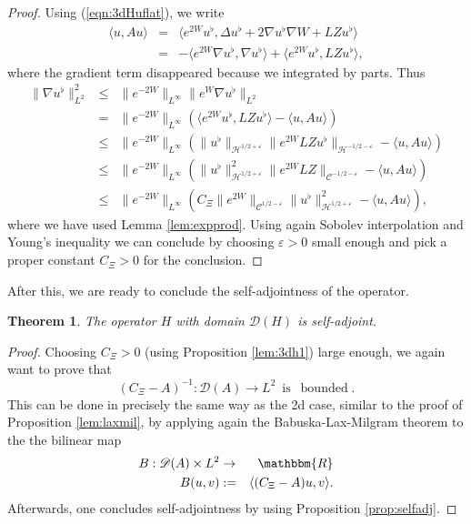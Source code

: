 \documentclass[11pt, oneside]{article}   	%
\newcommand{\tmop}[1]{\ensuremath{\operatorname{#1}}}
\newtheorem{theorem}{Theorem}[section]
\newcommand{\CC}{\mathscr{C}}
\newcommand{\ssp}{\mathscr{H}}
\begin{document}
\begin{proof}
	Using (\ref{eqn:3dHuflat}), we write
	\begin{eqnarray*}
		\langle u, A u \rangle & = & \langle e^{2 W} u^{\flat}, \Delta u^{\flat} +
		2 \nabla u^{\flat} \nabla W + L Z u^{\flat} \rangle\\
		& = & - \langle e^{2 W} \nabla u^{\flat}, \nabla u^{\flat} \rangle +
		\langle e^{2 W} u^{\flat}, L Z u^{\flat} \rangle,
	\end{eqnarray*}
	where the gradient term disappeared because we integrated by parts. Thus
	\begin{eqnarray*}
		\| \nabla u^{\flat} \|^2_{L^2} & \le & \| e^{- 2 W} \|_{L^{\infty}}
		\| e^W \nabla u^{\flat} \|_{L^2}\\
		& = & \| e^{- 2 W} \|_{L^{\infty}} (\langle e^{2 W} u^{\flat}, L Z u^{\flat} \rangle - \langle u, A u \rangle)\\
		& \le & \| e^{- 2 W} \|_{L^{\infty}} (\| u^{\flat} \|_{\ssp^{1 / 2 +
				\varepsilon}} \| e^{2 W} L Z u^{\flat} \|_{\ssp^{- 1 / 2 -
				\varepsilon}} - \langle u, A u \rangle)\\
		& \le & \| e^{- 2 W} \|_{L^{\infty}} (\| u^{\flat} \|^2_{\ssp^{1 / 2 +
				\varepsilon}} \| e^{2 W} L Z \|_{\CC^{- 1 / 2 -
				\varepsilon}} - \langle u, A u \rangle)\\
		& \le & \| e^{- 2 W} \|_{L^{\infty}} (C_{\Xi} \| e^{2 W}
		\|_{\CC^{1 / 2 - \varepsilon}} \| u^{\flat} \|^2_{\ssp^{1 / 2 +
				\varepsilon}} - \langle u, A u \rangle),
	\end{eqnarray*}
	where we have used Lemma \ref{lem:expprod}. Using again Sobolev
	interpolation and Young's inequality we can conclude by choosing
	$\varepsilon > 0$ small enough and pick a proper constant $C_\Xi >0$ for the conclusion.
\end{proof}

After this, we are ready to conclude the self-adjointness of the operator.
\begin{theorem} \label{thm:3dselfadj}
	The operator $H$ with domain $\mathscr{D}
	(H)$ is self-adjoint.
\end{theorem}
\begin{proof}
	Choosing $C_{\Xi} > 0$ (using Proposition \ref{lem:3dh1})
	large enough, we again want to prove that
	\[ (C_{\Xi} - A)^{- 1} : \mathscr{D} (A) \rightarrow L^2 \ \tmop{is} \
	\tmop{bounded} . \]
	This can be done in precisely the same way as the 2d case, similar to the proof of Proposition \ref{lem:laxmil},  by applying again the Babuska-Lax-Milgram theorem to the the bilinear map
	\begin{eqnarray*}
		B : \mathscr{D} (A) \times L^2 & \rightarrow & \mathbbm{R}\\
		B (u, v) & : = & \langle (C_{\Xi} - A) u, v \rangle .
	\end{eqnarray*}
	Afterwards, one concludes self-adjointness by using Proposition \ref{prop:selfadj}.
\end{proof}
\end{document}
